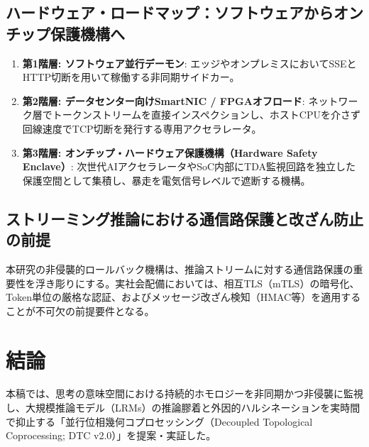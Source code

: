 \documentclass[11pt,a4paper]{article}
\begin{document}
\subsection{ハードウェア・ロードマップ：ソフトウェアからオンチップ保護機構へ}
\begin{enumerate}
    \item \textbf{第1階層: ソフトウェア並行デーモン}: エッジやオンプレミスにおいてSSEとHTTP切断を用いて稼働する非同期サイドカー。
    \item \textbf{第2階層: データセンター向けSmartNIC / FPGAオフロード}: ネットワーク層でトークンストリームを直接インスペクションし、ホストCPUを介さず回線速度でTCP切断を発行する専用アクセラレータ。
    \item \textbf{第3階層: オンチップ・ハードウェア保護機構（Hardware Safety Enclave）}: 次世代AIアクセラレータやSoC内部にTDA監視回路を独立した保護空間として集積し、暴走を電気信号レベルで遮断する機構。
\end{enumerate}

\subsection{ストリーミング推論における通信路保護と改ざん防止の前提}
本研究の非侵襲的ロールバック機構は、推論ストリームに対する通信路保護の重要性を浮き彫りにする。実社会配備においては、相互TLS（mTLS）の暗号化、Token単位の厳格な認証、およびメッセージ改ざん検知（HMAC等）を適用することが不可欠の前提要件となる。

\section{結論}

本稿では、思考の意味空間における持続的ホモロジーを非同期かつ非侵襲に監視し、大規模推論モデル（LRMs）の推論膠着と外因的ハルシネーションを実時間で抑止する「並行位相幾何コプロセッシング（Decoupled Topological Coprocessing; DTC v2.0）」を提案・実証した。
\end{document}
